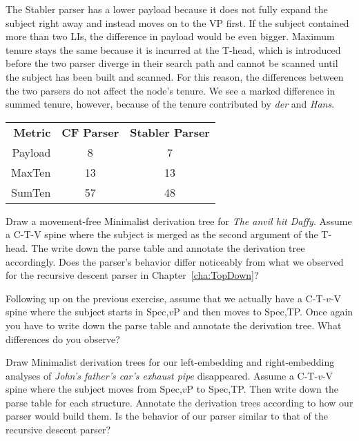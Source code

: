 \begin{examplebox}
\begin{center}
    \end{center}
    
    The Stabler parser has a lower payload because it does not fully expand the subject right away and instead moves on to the VP first.
    If the subject contained more than two LIs, the difference in payload would be even bigger.
    Maximum tenure stays the same because it is incurred at the T-head, which is introduced before the two parser diverge in their search path and cannot be scanned until the subject has been built and scanned.
    For this reason, the differences between the two parsers do not affect the node's tenure.
    We see a marked difference in summed tenure, however, because of the tenure contributed by \emph{der} and \emph{Hans}.
    \begin{center}
        \begin{tabular}{rcc}
            \textbf{Metric} & \textbf{CF Parser} & \textbf{Stabler Parser}\\
            Payload & 8 & 7\\
            MaxTen & 13 & 13\\
            SumTen & 57 & 48
        \end{tabular}
    \end{center}
\end{examplebox}
%
\begin{exercise}
    Draw a movement-free Minimalist derivation tree for \emph{The anvil hit Daffy}.
    Assume a C-T-V spine where the subject is merged as the second argument of the T-head.
    The write down the parse table and annotate the derivation tree accordingly.
    Does the parser's behavior differ noticeably from what we observed for the recursive descent parser in Chapter~\ref{cha:TopDown}?
\end{exercise}
%
\begin{exercise}
    Following up on the previous exercise, assume that we actually have a C-T-$v$-V spine where the subject starts in Spec,$v$P and then moves to Spec,TP\@.
    Once again you have to write down the parse table and annotate the derivation tree.
    What differences do you observe?
\end{exercise}

\begin{exercise}
    Draw Minimalist derivation trees for our left-embedding and right-embedding analyses of \emph{John's father's car's exhaust pipe} disappeared.
    Assume a C-T-$v$-V spine where the subject moves from Spec,$v$P to Spec,TP\@.
    Then write down the parse table for each structure. 
    Annotate the derivation trees according to how our parser would build them.
    Is the behavior of our parser similar to that of the recursive descent parser?
\end{exercise}



